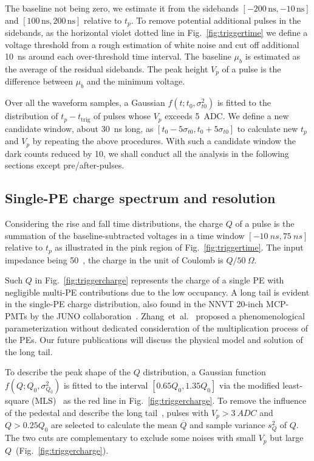 The baseline not being zero, we estimate it from the sidebands $[-200\,\mathrm{ns},-10\,\mathrm{ns}]$ and $[100\,\mathrm{ns},200\,\mathrm{ns}]$ relative to $t_p$. To remove potential additional pulses in the sidebands, as the horizontal violet dotted line in Fig.~\ref{fig:triggertime} we define a voltage threshold from a rough estimation of white noise and cut off additional \SI{10}{ns} around each over-threshold time interval. The baseline $\mu_b$ is estimated as the average of the residual sidebands. The peak height $V_p$ of a pulse is the difference between $\mu_b$ and the minimum voltage.

Over all the waveform samples, a Gaussian $f(t;t_0,\sigma_{t0}^2)$ is fitted to the distribution of $t_p-t_{\mathrm{trig}}$ of pulses whose $V_p$ exceeds \SI{5}{ADC}. We define a new candidate window, about \SI{30}{ns} long, as $[t_0-5\sigma_{t0}, t_0+5\sigma_{t0}]$ to calculate new $t_p$ and $V_p$ by repeating the above procedures.  With such a candidate window the dark counts reduced by 10, we shall conduct all the analysis in the following sections except pre/after-pulses.

\subsection{Single-PE charge spectrum and resolution}
\label{sec:noisepeak}

Considering the rise and fall time distributions, the charge $Q$ of a pulse is the summation of the baseline-subtracted voltages in a time window $[\SI{-10}{ns}, \SI{75}{ns}]$ relative to $t_p$ as illustrated in the pink region of Fig.~\ref{fig:triggertime}. The input impedance being \SI{50}{\Omega}~\cite{CAENV1751}, the charge in the unit of Coulomb is $Q/\SI{50}{\Omega}$.

Such $Q$ in Fig.~\ref{fig:triggercharge} represents the charge of a single PE with negligible multi-PE contributions due to the low occupancy. A long tail is evident in the single-PE charge distribution, also found in the NNVT 20-inch MCP-PMTs by the JUNO collaboration~\cite{JUNOMassTesting}. Zhang~et~al.~\cite{JUNOLongtail} proposed a phenomenological parameterization without dedicated consideration of the multiplication process of the PEs. Our future publications will discuss the physical model and solution of the long tail.

To describe the peak shape of the $Q$ distribution, a Gaussian function $f(Q;Q_0,\sigma^2_{Q_0})$ is fitted to the interval $[0.65Q_0, 1.35Q_0]$ via the modified least-square (MLS)~\cite{Cowan1998StatisticalDA} as the red line in Fig.~\ref{fig:triggercharge}. To remove the influence of the pedestal and describe the long tail~\cite{JUNOLongtail}, pulses with $V_p>\SI{3}{ADC}$ and $Q>0.25Q_0$ are selected to calculate the mean $\overline{Q}$ and sample variance $s^2_{Q}$ of $Q$.
The two cuts are complementary to exclude some noises with small $V_p$ but large $Q$~(Fig.~\ref{fig:triggercharge}).

